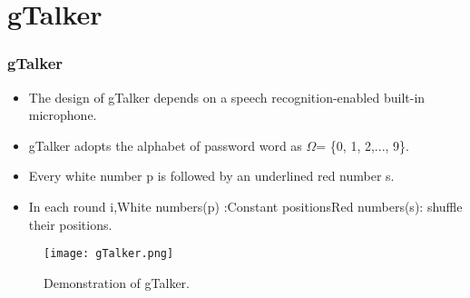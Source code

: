 \documentclass{beamer}
\begin{document}
\section{gTalker}
\begin{frame}
\frametitle{gTalker}

\begin{itemize}
\justifying

    
    \item The design of gTalker depends on a speech
    recognition-enabled built-in microphone.
    
    \item  gTalker adopts the alphabet of password word as \newline $\Omega$= \{0, 1, 2,..., 9\}.
    
    \item Every white number p is followed by an underlined red number s.
    \item In each round i,\newline White numbers(p) :Constant positions\newline Red numbers(s): shuffle their
positions.
\end{itemize}

\begin{figure}
    \begin{center}
        \texttt{[image: gTalker.png]}
        \caption{Demonstration of gTalker.}
    \end{center}
\end{figure}

\end{frame}
\end{document}
